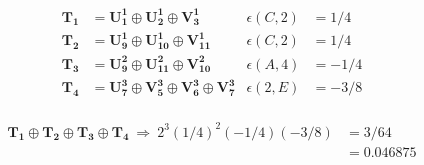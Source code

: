 \begin{equation*}
\begin{aligned}
    \mathbf{T_1} &= \mathbf{U^1_1} \oplus{} \mathbf{U^1_2} \oplus{} \mathbf{V^1_3}
    & \epsilon(C,2) &= 1/4 \\
    \mathbf{T_2} &= \mathbf{U^1_9} \oplus{} \mathbf{U^1_{10}} \oplus{} \mathbf{V^1_{11}}
    & \epsilon(C,2) &= 1/4 \\
    \mathbf{T_3} &= \mathbf{U^2_9} \oplus{} \mathbf{U^2_{11}} \oplus{} \mathbf{V^2_{10}}
    & \epsilon(A,4) &= -1/4 \\
    \mathbf{T_4} &= \mathbf{U^3_7} \oplus{} \mathbf{V^3_5} \oplus{} \mathbf{V^3_6} \oplus{} \mathbf{V^3_7}
    & \epsilon(2,E) &= -3/8 \\
\end{aligned}
\end{equation*}

\begin{equation*}
\begin{aligned}
    \mathbf{T_1} \oplus{} \mathbf{T_2} \oplus{} \mathbf{T_3} \oplus{} \mathbf{T_4} \
    \Rightarrow \ 2^3(1/4)^2(-1/4)(-3/8) &= 3/64 \\ 
    &= 0.046875\\
\end{aligned}
\end{equation*}